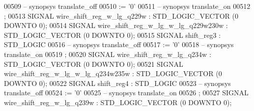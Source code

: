 \begin{DoxyCode}
{00509 \textcolor{keyword}{     -- synopsys translate\_off}
00510       \textcolor{vhdlchar}{:=} \textcolor{vhdlchar}{'}\textcolor{vhdllogic}{}\textcolor{vhdllogic}{0}\textcolor{vhdlchar}{'}
00511 \textcolor{keyword}{     -- synopsys translate\_on}
00512      ;
00513      \textcolor{keywordflow}{SIGNAL}  \textcolor{vhdlchar}{wire_shift_reg_w_lg_q229w}  \textcolor{vhdlchar}{:}   \textcolor{comment}{STD\_LOGIC\_VECTOR} \textcolor{vhdlchar}{(}\textcolor{vhdllogic}{}\textcolor{vhdllogic}{0} \textcolor{keywordflow}{DOWNTO} \textcolor{vhdllogic}{}\textcolor{vhdllogic}{0}\textcolor{vhdlchar}{)};
00514      \textcolor{keywordflow}{SIGNAL}  \textcolor{vhdlchar}{wire_shift_reg_w_lg_w_lg_q229w230w} \textcolor{vhdlchar}{:}   \textcolor{comment}{STD\_LOGIC\_VECTOR} \textcolor{vhdlchar}{(}\textcolor{vhdllogic}{}\textcolor{vhdllogic}{0} \textcolor{keywordflow}{DOWNTO} \textcolor{vhdllogic}{}\textcolor{vhdllogic}{0}\textcolor{vhdlchar}{)};
00515      \textcolor{keywordflow}{SIGNAL}  \textcolor{vhdlchar}{shift_reg3} \textcolor{vhdlchar}{:}   \textcolor{comment}{STD\_LOGIC}
00516 \textcolor{keyword}{     -- synopsys translate\_off}
00517       \textcolor{vhdlchar}{:=} \textcolor{vhdlchar}{'}\textcolor{vhdllogic}{}\textcolor{vhdllogic}{0}\textcolor{vhdlchar}{'}
00518 \textcolor{keyword}{     -- synopsys translate\_on}
00519      ;
00520      \textcolor{keywordflow}{SIGNAL}  \textcolor{vhdlchar}{wire_shift_reg_w_lg_q234w}  \textcolor{vhdlchar}{:}   \textcolor{comment}{STD\_LOGIC\_VECTOR} \textcolor{vhdlchar}{(}\textcolor{vhdllogic}{}\textcolor{vhdllogic}{0} \textcolor{keywordflow}{DOWNTO} \textcolor{vhdllogic}{}\textcolor{vhdllogic}{0}\textcolor{vhdlchar}{)};
00521      \textcolor{keywordflow}{SIGNAL}  \textcolor{vhdlchar}{wire_shift_reg_w_lg_w_lg_q234w235w} \textcolor{vhdlchar}{:}   \textcolor{comment}{STD\_LOGIC\_VECTOR} \textcolor{vhdlchar}{(}\textcolor{vhdllogic}{}\textcolor{vhdllogic}{0} \textcolor{keywordflow}{DOWNTO} \textcolor{vhdllogic}{}\textcolor{vhdllogic}{0}\textcolor{vhdlchar}{)};
00522      \textcolor{keywordflow}{SIGNAL}  \textcolor{vhdlchar}{shift_reg4} \textcolor{vhdlchar}{:}   \textcolor{comment}{STD\_LOGIC}
00523 \textcolor{keyword}{     -- synopsys translate\_off}
00524       \textcolor{vhdlchar}{:=} \textcolor{vhdlchar}{'}\textcolor{vhdllogic}{}\textcolor{vhdllogic}{0}\textcolor{vhdlchar}{'}
00525 \textcolor{keyword}{     -- synopsys translate\_on}
00526      ;
00527      \textcolor{keywordflow}{SIGNAL}  \textcolor{vhdlchar}{wire_shift_reg_w_lg_q239w}  \textcolor{vhdlchar}{:}   \textcolor{comment}{STD\_LOGIC\_VECTOR} \textcolor{vhdlchar}{(}\textcolor{vhdllogic}{}\textcolor{vhdllogic}{0} \textcolor{keywordflow}{DOWNTO} \textcolor{vhdllogic}{}\textcolor{vhdllogic}{0}\textcolor{vhdlchar}{)};
}
\end{DoxyCode}
